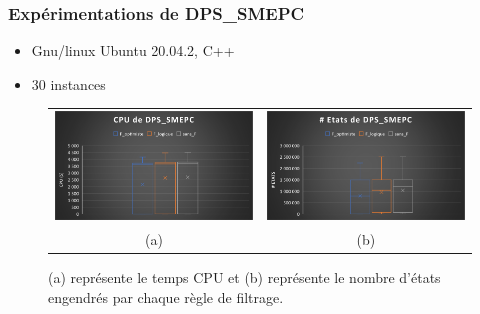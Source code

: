 \documentclass[hyperref={bookmarks=false},aspectratio=169]{beamer}
\begin{document}
\begin{frame}
\frametitle{Expérimentations de \textbf{DPS\_SMEPC}}%
\begin{itemize}
\item Gnu/linux Ubuntu 20.04.2, C++
\item 30 instances
\end{itemize}

\begin{figure}[H]
	\centering
	\begin{tabular}{c c}
		\includegraphics[width=6.5cm]{figures/sombre_slide_CPU_DPs_SMEPC_INST_VAR.pdf}&%
		\includegraphics[width=6.5cm]{figures/sombre_slide_Etats_DPS_SMEPC_INST_VAR.pdf}%
		\\
		(a) & (b)
	\end{tabular}
	\caption{(a) représente le temps CPU et (b) représente le nombre d'états engendrés par chaque règle de filtrage.}\label{gap_cpu_DPS_SMEPC_INST_VAR}%
\end{figure}
\end{frame}

\end{document}

